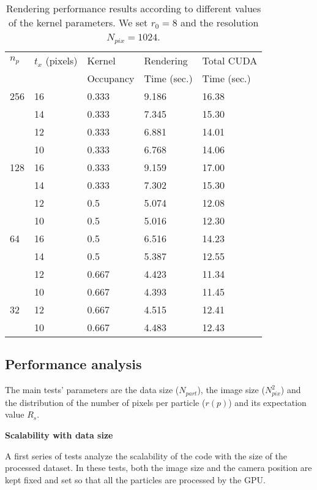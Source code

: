 \documentclass[1p]{elsarticle}
\begin{document}
\begin{table}
\begin{center}
\begin{tabular}{|l|l|l|l|l|}
\hline
$n_p$ & $t_x$ (pixels) & Kernel & Rendering & Total CUDA \\
& & Occupancy & Time (sec.) & Time (sec.) \\
\hline
256   & 16 & 0.333 & 9.186 & 16.38 \\
\hline
      & 14 & 0.333 & 7.345  & 15.30 \\
\hline
      & 12 & 0.333 & 6.881  & 14.01 \\
\hline
      & 10 & 0.333 & 6.768 & 14.06 \\
\hline
128   & 16 & 0.333 & 9.159 & 17.00 \\
\hline
      & 14 & 0.333 & 7.302  & 15.30 \\
\hline
      & 12 & 0.5 & 5.074  & 12.08 \\
\hline
      & 10 & 0.5 & 5.016 & 12.30 \\ 
\hline
64    & 16 & 0.5 & 6.516 & 14.23 \\
\hline
      & 14 & 0.5 & 5.387 & 12.55 \\
\hline
      & 12 & 0.667 & 4.423 & 11.34 \\
\hline
      & 10 & 0.667 & 4.393 & 11.45 \\ 
\hline
32    & 12 & 0.667 & 4.515 & 12.41 \\
\hline
      & 10 & 0.667 & 4.483 & 12.43 \\ 
\hline
\end{tabular}
\caption{Rendering performance results according to different values of the kernel parameters. We set $r_0=8$ and the resolution $N_{pix}=1024$.}
\end{center}
\label{tab:tuning}
\end{table}

\subsection{Performance analysis}
\label{sec:performance}
The main tests' parameters are the data size ($N_{part}$),
the image size ($N_{pix}^2$) and the distribution of the number of pixels 
per particle ($r(p)$) and its expectation value $R_s$.

\medskip
\noindent 
{\bf Scalability with data size}

\noindent
A first series of tests analyze the scalability of the code
with the size of the processed dataset. In these tests, both the image size
and the camera position are kept fixed and set so that all the particles are processed 
by the GPU.
\end{document}
